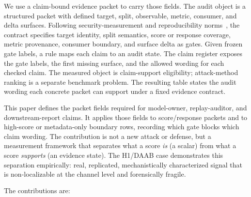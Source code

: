 \documentclass[10pt,conference]{IEEEtran}
\begin{document}
We use a claim-bound evidence packet to carry those fields. The audit object is a
structured packet with defined target, split, observable, metric, consumer, and
delta surfaces. Following security-measurement and
reproducibility norms~\cite{herley2017sokscience,vanderkouwe2020benchmarking,pineau2021reproducibility},
the contract specifies target identity, split semantics, score or response
coverage, metric provenance, consumer boundary, and surface delta as gates.
Given frozen gate labels, a rule maps each claim to an audit state. The claim
register exposes the gate labels, the first missing surface, and the allowed
wording for each checked claim. The measured object is claim-support
eligibility; attack-method ranking is a separate benchmark problem. The
resulting table states the audit wording each concrete packet can support under
a fixed evidence contract.

This paper defines the packet fields required for model-owner, replay-auditor,
and downstream-report claims. It applies those fields to score/response packets
and to high-score or metadata-only boundary rows, recording which gate blocks
which claim wording. The contribution is not a new attack or defense, but a
measurement framework that separates what a score \emph{is} (a scalar) from what
a score \emph{supports} (an evidence state). The H1/DAAB case demonstrates this
separation empirically: real, replicated, mechanistically characterized signal
that is non-localizable at the channel level and forensically fragile.

The contributions are:
\end{document}
